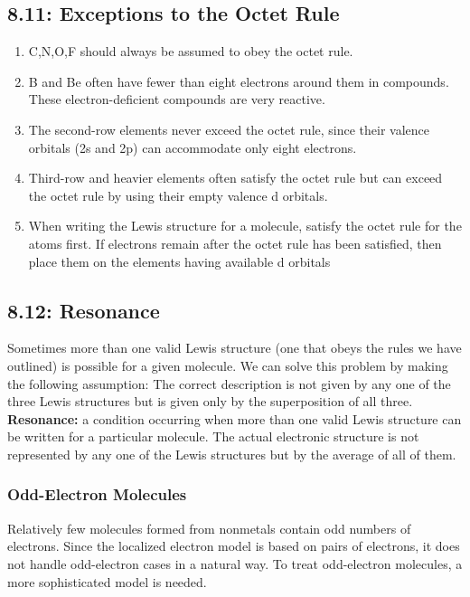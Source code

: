 \documentclass[12pt]{extarticle}
\begin{document}
\subsection*{8.11: Exceptions to the Octet Rule}
\begin{enumerate}
    \item C,N,O,F should always be assumed to obey the octet rule.
    \item B and Be often have fewer than eight electrons around them in compounds. These electron-deficient compounds are very reactive.
    \item The second-row elements never exceed the octet rule, since their valence orbitals (2s and 2p) can accommodate only eight electrons.
    \item Third-row and heavier elements often satisfy the octet rule but can exceed the octet rule by using their empty valence d orbitals.
    \item When writing the Lewis structure for a molecule, satisfy the octet rule for the atoms first. If electrons remain after the octet rule has been satisfied, then place them on the elements having available d orbitals
\end{enumerate}

\subsection*{8.12: Resonance}
Sometimes more than one valid Lewis structure (one that obeys the rules we have outlined) is possible for a given molecule.
We can solve this problem by making the following assumption: The correct description is not given by any one of the three Lewis structures but is given only by the superposition of all three.
\textbf{Resonance: }
a condition occurring when more than one valid Lewis structure can be written for a particular molecule. The actual electronic structure is not represented by any one of the Lewis structures but by the average of all of them.
\subsubsection*{Odd-Electron Molecules}
Relatively few molecules formed from nonmetals contain odd numbers of electrons. Since the localized electron model is based on pairs of electrons, it does not handle odd-electron cases in a natural way. To treat odd-electron molecules, a more sophisticated model is needed.
\end{document}

